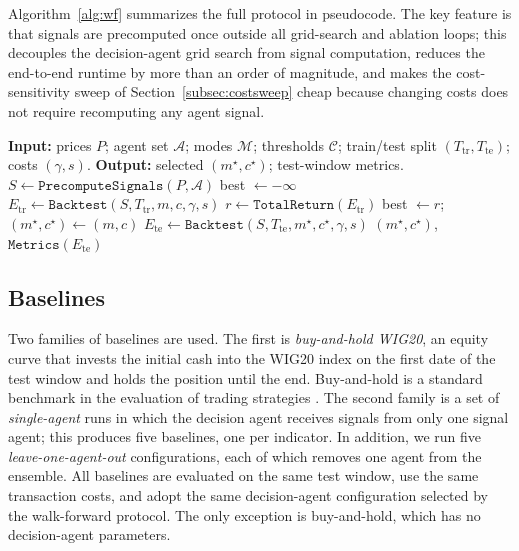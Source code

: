 \documentclass{ieeeaccess}
\begin{document}
Algorithm~\ref{alg:wf} summarizes the full protocol in pseudocode. The key feature is that signals are precomputed once outside all grid-search and ablation loops; this decouples the decision-agent grid search from signal computation, reduces the end-to-end runtime by more than an order of magnitude, and makes the cost-sensitivity sweep of Section~\ref{subsec:costsweep} cheap because changing costs does not require recomputing any agent signal.

\begin{algorithm}[t]
\caption{Anchored walk-forward with precomputed signals}
\label{alg:wf}
\begin{algorithmic}[1]
\STATE \textbf{Input:} prices $P$; agent set $\mathcal{A}$; modes $\mathcal{M}$; thresholds $\mathcal{C}$; train/test split $(T_\text{tr}, T_\text{te})$; costs $(\gamma, s)$.
\STATE \textbf{Output:} selected $(m^\star, c^\star)$; test-window metrics.
\STATE $S \gets \mathtt{PrecomputeSignals}(P, \mathcal{A})$ 
\STATE best $\gets -\infty$
  \STATE $E_\text{tr} \gets \mathtt{Backtest}(S, T_\text{tr}, m, c, \gamma, s)$
  \STATE $r \gets \mathtt{TotalReturn}(E_\text{tr})$
    \STATE best $\gets r$; $(m^\star, c^\star) \gets (m, c)$
  \ENDIF
\ENDFOR
\STATE $E_\text{te} \gets \mathtt{Backtest}(S, T_\text{te}, m^\star, c^\star, \gamma, s)$
\RETURN $(m^\star, c^\star)$, $\mathtt{Metrics}(E_\text{te})$
\end{algorithmic}
\end{algorithm}

\subsection{Baselines}
\label{subsec:baselines}

Two families of baselines are used. The first is \emph{buy-and-hold WIG20}, an equity curve that invests the initial cash into the WIG20 index on the first date of the test window and holds the position until the end. Buy-and-hold is a standard benchmark in the evaluation of trading strategies \cite{dichtl2020}. The second family is a set of \emph{single-agent} runs in which the decision agent receives signals from only one signal agent; this produces five baselines, one per indicator. In addition, we run five \emph{leave-one-agent-out} configurations, each of which removes one agent from the ensemble. All baselines are evaluated on the same test window, use the same transaction costs, and adopt the same decision-agent configuration selected by the walk-forward protocol. The only exception is buy-and-hold, which has no decision-agent parameters.
\end{document}
